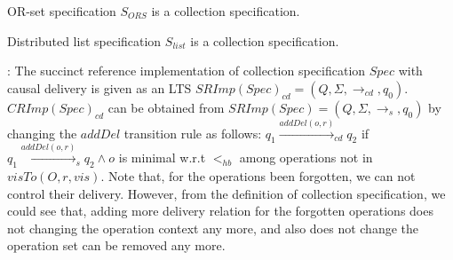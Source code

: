 
{\color {red}
\begin{lemma}
\label{lemma:OR-set is collection specification}
OR-set specification $S_{\mathit{ORS}}$ is a collection specification.
\end{lemma}
}


{\color {red}
\begin{lemma}
\label{lemma:list is collection specification}
Distributed list specification $S_{\mathit{list}}$ is a collection specification.
\end{lemma}
}


: The succinct reference implementation of collection specification $\mathit{Spec}$ with causal delivery is given as an LTS $\mathit{SRImp}(\mathit{Spec})_{\mathit{cd}} = (Q,\Sigma,\rightarrow_{\mathit{cd}},q_0)$. $\mathit{CRImp}(\mathit{Spec})_{\mathit{cd}}$ can be obtained from $\mathit{SRImp}(\mathit{Spec}) = (Q,\Sigma,\rightarrow_s,q_0)$ by changing the $\mathit{addDel}$ transition rule as follows: $q_1 {\xrightarrow{\mathit{addDel}(o,r)}}_{cd} q_2$ if $q_1 {\xrightarrow{\mathit{addDel}(o,r)}}_s q_2 \wedge o$ is minimal w.r.t $<_{hb}$ among operations not in $\mathit{visTo}(O,r,\mathit{vis})$. %
{\color {red}Note that, for the operations been forgotten, we can not control their delivery. However, from the definition of collection specification, we could see that, adding more delivery relation for the forgotten operations does not changing the operation context any more, and also does not change the operation set can be removed any more.}
























